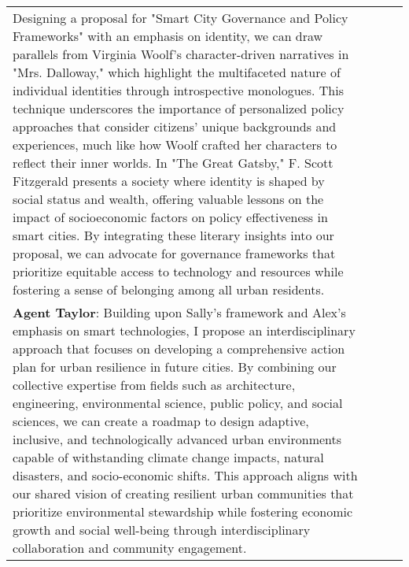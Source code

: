\documentclass{article}
\begin{document}
\begin{appendix}
\begin{tabular}{| m{2cm} | m{3cm} | m{5cm} | m{5cm} |}
Designing a proposal for "Smart City Governance and Policy Frameworks" with an emphasis on identity, we can draw parallels from Virginia Woolf's character-driven narratives in "Mrs. Dalloway," which highlight the multifaceted nature of individual identities through introspective monologues. This technique underscores the importance of personalized policy approaches that consider citizens' unique backgrounds and experiences, much like how Woolf crafted her characters to reflect their inner worlds. In "The Great Gatsby," F. Scott Fitzgerald presents a society where identity is shaped by social status and wealth, offering valuable lessons on the impact of socioeconomic factors on policy effectiveness in smart cities. By integrating these literary insights into our proposal, we can advocate for governance frameworks that prioritize equitable access to technology and resources while fostering a sense of belonging among all urban residents. \\ 
\textbf{Agent Taylor}: Building upon Sally's framework and Alex's emphasis on smart technologies, I propose an interdisciplinary approach that focuses on developing a comprehensive action plan for urban resilience in future cities. By combining our collective expertise from fields such as architecture, engineering, environmental science, public policy, and social sciences, we can create a roadmap to design adaptive, inclusive, and technologically advanced urban environments capable of withstanding climate change impacts, natural disasters, and socio-economic shifts. This approach aligns with our shared vision of creating resilient urban communities that prioritize environmental stewardship while fostering economic growth and social well-being through interdisciplinary collaboration and community engagement.


\end{tabular}
\end{appendix}
\end{document}
